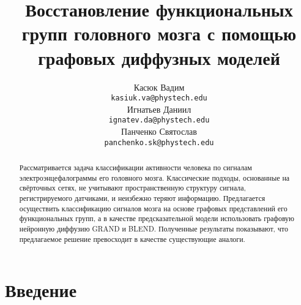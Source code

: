 \documentclass{article}
\title{Восстановление функциональных групп головного мозга с помощью графовых диффузных моделей}
\author{
	Касюк Вадим \\
	\texttt{kasiuk.va@phystech.edu} \\
	\And
	Игнатьев Даниил \\
	\texttt{ignatev.da@phystech.edu} \\
	\And
	Панченко Святослав \\
	\texttt{panchenko.sk@phystech.edu}
}
\date{}
\begin{document}
\maketitle

\begin{abstract}
Рассматривается задача классификации активности человека по сигналам электроэнцефалограммы его головного мозга. Классические подходы, основанные на свёрточных сетях, не учитывают пространственную структуру сигнала, регистрируемого датчиками, и неизбежно теряют информацию. Предлагается осуществить классификацию сигналов мозга на основе графовых представлений его функциональных групп, а в качестве предсказательной модели использовать графовую нейронную диффузию GRAND и BLEND. Полученные результаты показывают, что предлагаемое решение превосходит в качестве существующие аналоги.

\end{abstract}



\section{Введение}


%
\end{document}
